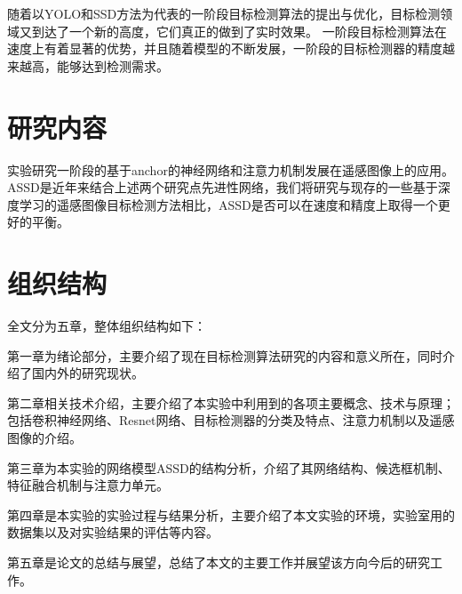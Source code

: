 随着以YOLO\cite{YOLO}和SSD\cite{SSD}方法为代表的一阶段目标检测算法的提出与优化，目标检测领域又到达了一个新的高度，它们真正的做到了实时效果。
一阶段目标检测算法在速度上有着显著的优势，并且随着模型的不断发展，一阶段的目标检测器的精度越来越高，能够达到检测需求。




\section{研究内容}

实验研究一阶段的基于anchor的神经网络和注意力机制发展在遥感图像上的应用。ASSD\cite{ASSD}是近年来结合上述两个研究点先进性网络，我们将研究与现存的一些基于深度学习的遥感图像目标检测方法相比，ASSD是否可以在速度和精度上取得一个更好的平衡。

\section{组织结构}

全文分为五章，整体组织结构如下：

第一章为绪论部分，主要介绍了现在目标检测算法研究的内容和意义所在，同时介绍了国内外的研究现状。

第二章相关技术介绍，主要介绍了本实验中利用到的各项主要概念、技术与原理；包括卷积神经网络、Resnet网络、目标检测器的分类及特点、注意力机制以及遥感图像的介绍。

第三章为本实验的网络模型ASSD的结构分析，介绍了其网络结构、候选框机制、特征融合机制与注意力单元。

第四章是本实验的实验过程与结果分析，主要介绍了本文实验的环境，实验室用的数据集以及对实验结果的评估等内容。

第五章是论文的总结与展望，总结了本文的主要工作并展望该方向今后的研究工作。

